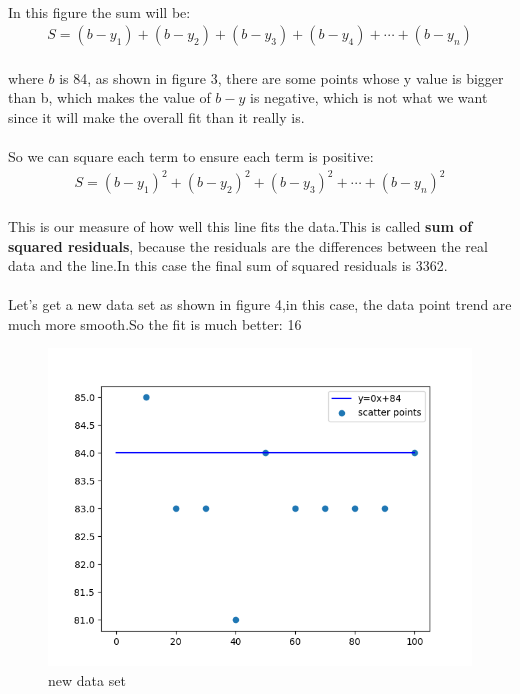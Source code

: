 \documentclass[a4paper,12pt]{article}
\begin{document}
\begin{spacing}{2}
\paragraph{ } In this figure the sum will be:
\begin{align}
S=(b-y_{1})+(b-y_{2})+(b-y_{3})+(b-y_{4})+\cdots+(b-y_{n})
\end{align}
\paragraph{ } where $b$ is 84, as shown in figure 3, there are some points whose y value is bigger than b, which makes the value of $b-y$ is negative, which is not what we want since it will make the overall fit than it really is.\\
\paragraph{ } So we can square each term to ensure each term is positive:
\begin{align}
S={(b-y_{1})}^2+{(b-y_{2})}^2+{(b-y_{3})}^2+\cdots+{(b-y_{n})}^2
\end{align}
\paragraph{ }This is our measure of how well this line fits the data.This is called \textbf{sum of squared residuals}, because the residuals are the differences between the real data and the line.In this case the final sum of squared residuals is 3362.
\paragraph{ }Let's get a new data set as shown in figure 4,in this case, the data point trend are much more smooth.So the fit is much better: 16
\newpage
\begin{figure}[h]
\centering
\includegraphics[scale=0.5]{Figure_4.png}
\caption{new data set}
\label{new fitting line}
\end{figure}

\end{spacing}
\end{document}
